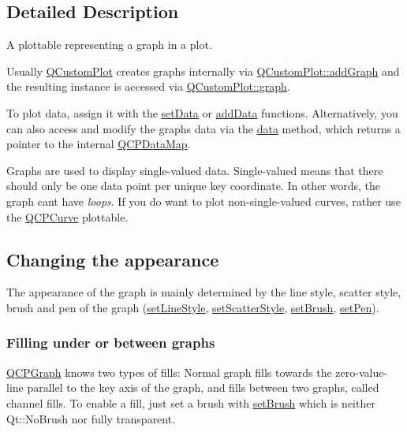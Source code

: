 \subsection{Detailed Description}
A plottable representing a graph in a plot. 



Usually \hyperlink{class_q_custom_plot}{Q\+Custom\+Plot} creates graphs internally via \hyperlink{class_q_custom_plot_a6fb2873d35a8a8089842d81a70a54167}{Q\+Custom\+Plot\+::add\+Graph} and the resulting instance is accessed via \hyperlink{class_q_custom_plot_a6d3ed93c2bf46ab7fa670d66be4cddaf}{Q\+Custom\+Plot\+::graph}.

To plot data, assign it with the \hyperlink{class_q_c_p_graph_a1df2fd710545c8ba3b2c99a39a27bf8b}{set\+Data} or \hyperlink{class_q_c_p_graph_aa5c6181d84db72ce4dbe9dc15a34ef4f}{add\+Data} functions. Alternatively, you can also access and modify the graph\textquotesingle{}s data via the \hyperlink{class_q_c_p_graph_a2f58436df4f86a2792b776a21642b3d9}{data} method, which returns a pointer to the internal \hyperlink{qcustomplot_8h_a84a9c4a4c2216ccfdcb5f3067cda76e3}{Q\+C\+P\+Data\+Map}.

Graphs are used to display single-\/valued data. Single-\/valued means that there should only be one data point per unique key coordinate. In other words, the graph can\textquotesingle{}t have {\itshape loops}. If you do want to plot non-\/single-\/valued curves, rather use the \hyperlink{class_q_c_p_curve}{Q\+C\+P\+Curve} plottable.\hypertarget{class_q_c_p_statistical_box_appearance}{}\subsection{Changing the appearance}\label{class_q_c_p_statistical_box_appearance}
The appearance of the graph is mainly determined by the line style, scatter style, brush and pen of the graph (\hyperlink{class_q_c_p_graph_a513fecccff5b2a50ce53f665338c60ff}{set\+Line\+Style}, \hyperlink{class_q_c_p_graph_a12bd17a8ba21983163ec5d8f42a9fea5}{set\+Scatter\+Style}, \hyperlink{class_q_c_p_abstract_plottable_a7a4b92144dca6453a1f0f210e27edc74}{set\+Brush}, \hyperlink{class_q_c_p_abstract_plottable_ab74b09ae4c0e7e13142fe4b5bf46cac7}{set\+Pen}).\hypertarget{class_q_c_p_graph_filling}{}\subsubsection{Filling under or between graphs}\label{class_q_c_p_graph_filling}
\hyperlink{class_q_c_p_graph}{Q\+C\+P\+Graph} knows two types of fills\+: Normal graph fills towards the zero-\/value-\/line parallel to the key axis of the graph, and fills between two graphs, called channel fills. To enable a fill, just set a brush with \hyperlink{class_q_c_p_abstract_plottable_a7a4b92144dca6453a1f0f210e27edc74}{set\+Brush} which is neither Qt\+::\+No\+Brush nor fully transparent.

